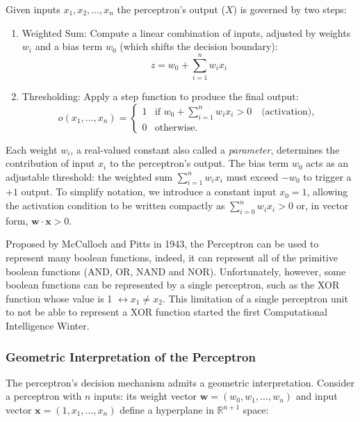 \documentclass{article}
\begin{document}
Given inputs $x_1, x_2, ..., x_n$ the perceptron's output ($X$) is governed by two steps:
\begin{enumerate}
    \item Weighted Sum: Compute a linear combination of inputs, adjusted by weights $w_i$ and a bias term $w_0$ (which shifts the decision boundary):
    \begin{equation}
        z = w_0 + \sum_{i=1}^{n}w_ix_i
    \end{equation}
    \item Thresholding:  Apply a step function to produce the final output:
    \begin{equation} \label{perceptron}
o(x_1, \dots, x_n) =
\begin{cases}
1 & \text{if } w_0 + \sum_{i=1}^n w_i x_i > 0 \quad \text{(activation)}, \\ 0 & \text{otherwise.}
\end{cases}
\end{equation}
\end{enumerate}

Each weight \( w_i \), a real-valued constant also called a \textit{parameter}, determines the contribution of input \( x_i \) to the perceptron's output. The bias term \( w_0 \) acts as an adjustable threshold: the weighted sum \( \sum_{i=1}^n w_i x_i \) must exceed \( -w_0 \) to trigger a \( +1 \) output. To simplify notation, we introduce a constant input \( x_0 = 1 \), allowing the activation condition to be written compactly as \( \sum_{i=0}^n w_i x_i > 0 \) or, in vector form, \( \mathbf{w} \cdot \mathbf{x} > 0 \).

Proposed by McCulloch and Pitts in 1943, the Perceptron can be used to represent many boolean functions, indeed, it can represent all of the primitive boolean functions (AND, OR, NAND and NOR). Unfortunately, however, some boolean functions can be represented by a single perceptron, such as the XOR function whose value is 1 $\leftrightarrow x_1 \neq x_2$. This limitation of a single perceptron unit to not be able to represent a XOR function started the first Computational Intelligence Winter.


\subsubsection{Geometric Interpretation of the Perceptron}

The perceptron's decision mechanism admits a geometric interpretation. Consider a perceptron with $n$ inputs: its weight vector $\mathbf{w} = (w_0, w_1, ..., w_n)$ and input vector $\mathbf{x} = (1, x_1, ..., x_n)$ define a hyperplane in $\mathbb{R}^{n+1}$ space:
\end{document}
